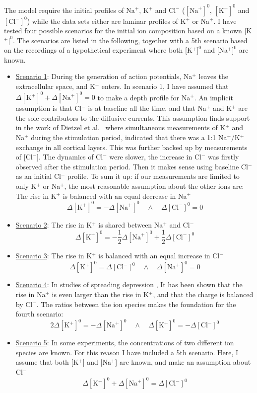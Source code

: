 \documentclass{article}
\begin{document}
The model require the initial profiles of Na$^+$, K$^+$ and Cl$^-$ ($[\text{Na}^+]^0$, $[\text{K}^+]^0$ and $[\text{Cl}^-]^0$) while the data sets either are laminar profiles of K$^+$ or Na$^+$. I have tested four possible scenarios for the initial ion composition based on a known [K$^+]^0$. The scenarios are listed in the following, together with a 5th scenario based on the recordings of a hypothetical experiment where  both [K$^+]^0$ and [Na$^+]^0$ are known.

\begin{itemize}\label{Scenarios}
	\item[]\underline{Scenario 1}: During the generation of action potentials, Na$^+$ leaves the extracellular space, and K$^+$ enters. In scenario 1, I have assumed that $\Delta [\text{K}^+]^0 + \Delta [\text{Na}^+]^0 = 0$ to make a depth profile for Na$^+$. An implicit assumption is that Cl$^-$ is at baseline all the time, and that Na$^+$ and K$^+$ are the sole contributors to the diffusive currents. This assumption finds support in the work of Dietzel et al.\ \cite{Dietzel1982} where simultaneous measurements of K$^+$ and Na$^+$ during the stimulation period, indicated that there was a 1:1 Na$^+$/K$^+$ exchange in all cortical layers. This was further backed up by measurements of [Cl$^-$]. The dynamics of Cl$^-$ were slower, the increase in Cl$^-$ was firstly observed after the stimulation period. Then it makes sense using baseline Cl$^-$ as an initial Cl$^-$ profile. 
To sum it up: if our measurements are limited to only K$^+$ or Na$^+$, the most reasonable assumption about the other ions are:
	The rise in K$^+$ is balanced with an equal decrease in Na$^+$
	  $$\Delta [\text{K}^+]^0 = -\Delta [\text{Na}^+]^0 \quad \land \quad \Delta [\text{Cl}^-]^0 =0$$
	\item[]\underline{Scenario 2}:  The rise in K$^+$ is shared between Na$^+$ and Cl$^-$
	$$\Delta [\text{K}^+]^0 = -\frac{1}{2} \Delta [\text{Na}^+]^0 +\frac{1}{2} \Delta [\text{Cl}^-]^0 $$ 
		\item[]\underline{Scenario 3}:  The rise in K$^+$ is balanced with an equal increase in Cl$^-$
	  $$\Delta [\text{K}^+]^0 = \Delta [\text{Cl}^-]^0 \quad \land \quad \Delta [\text{Na}^+]^0 =0$$
	  \item[]\underline{Scenario 4}:  In studies of spreading depression \cite{Ataya2015}\cite{Herreras1993}, It has been shown that the rise in Na$^+$ is even larger than the rise in K$^+$, and that the charge is balanced by Cl$^-$. The ratios between the ion species makes the foundation for the fourth scenario:
	$$2\Delta [\text{K}^+]^0 = - \Delta [\text{Na}^+]^0 \quad \land \quad \Delta [\text{K}^+]^0 =  -\Delta [\text{Cl}^-]^0 $$ 
	\item[]\underline{Scenario 5}: In some experiments, the concentrations of two different ion species are known. For this reason I have included a 5th scenario. Here, I assume that both [K$^+$] and [Na$^+$] are known, and make an assumption about Cl$^-$
	$$\Delta [\text{K}^+]^0 + \Delta [\text{Na}^+]^0 = \Delta[\text{Cl}^-]^0 $$
\end{itemize}
\end{document}
